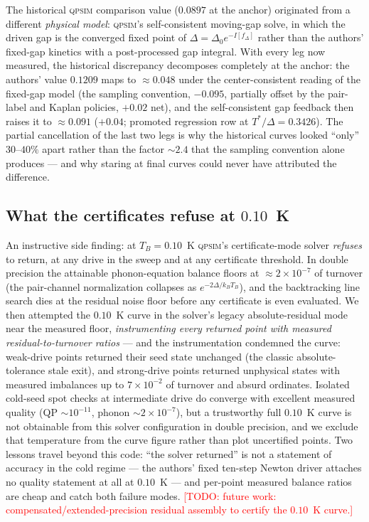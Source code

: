 \documentclass[reprint,amsmath,amssymb,aps,prapplied,nofootinbib]{revtex4-2}
\newcommand{\todo}[1]{\textcolor{red}{[TODO: #1]}}
\newcommand{\qpsim}{\textsc{qpsim}}
\begin{document}
The historical \qpsim{} comparison value ($0.0897$ at the anchor)
originated from a different \emph{physical model}: \qpsim{}'s
self-consistent moving-gap solve, in which the driven gap is the
converged fixed point of $\Delta = \Delta_0 e^{-I[f_\Delta]}$ rather
than the authors' fixed-gap kinetics with a post-processed gap
integral.  With every leg now measured, the historical discrepancy
decomposes completely at the anchor: the authors' value $0.1209$ maps
to $\approx 0.048$ under the center-consistent reading of the fixed-gap
model (the sampling convention, $-0.095$, partially offset by the
pair-label and Kaplan policies, $+0.02$ net), and the self-consistent
gap feedback then raises it to $\approx 0.091$ ($+0.04$; promoted
regression row at $T^*/\Delta = 0.3426$).  The partial cancellation of
the last two legs is why the historical curves looked ``only''
$30\text{--}40\%$ apart rather than the factor $\sim 2.4$ that the
sampling convention alone produces --- and why staring at final curves
could never have attributed the difference.

\subsection{What the certificates refuse at $0.10$~K}
\label{sec:certificates}

An instructive side finding: at $T_B = 0.10$~K \qpsim{}'s
certificate-mode solver \emph{refuses} to return, at any drive in the
sweep and at any certificate threshold.  In double precision the
attainable phonon-equation balance floors at $\approx 2\times10^{-7}$
of turnover (the pair-channel normalization collapses as
$e^{-2\Delta/k_BT_B}$), and the backtracking line search dies at the
residual noise floor before any certificate is even evaluated.  We then
attempted the $0.10$~K curve in the solver's legacy absolute-residual
mode near the measured floor, \emph{instrumenting every returned point
with measured residual-to-turnover ratios} --- and the instrumentation
condemned the curve: weak-drive points returned their seed state
unchanged (the classic absolute-tolerance stale exit), and strong-drive
points returned unphysical states with measured imbalances up to
$7\times10^{-2}$ of turnover and absurd ordinates.  Isolated cold-seed
spot checks at intermediate drive do converge with excellent measured
quality (QP $\sim 10^{-11}$, phonon $\sim 2\times10^{-7}$), but a
trustworthy full $0.10$~K curve is not obtainable from this solver
configuration in double precision, and we exclude that temperature from
the curve figure rather than plot uncertified points.  Two lessons
travel beyond this code: ``the solver returned'' is not a statement of
accuracy in the cold regime --- the authors' fixed ten-step Newton
driver attaches no quality statement at all at $0.10$~K --- and
per-point measured balance ratios are cheap and catch both failure
modes.  \todo{future work: compensated/extended-precision residual
assembly to certify the $0.10$~K curve.}
\end{document}
